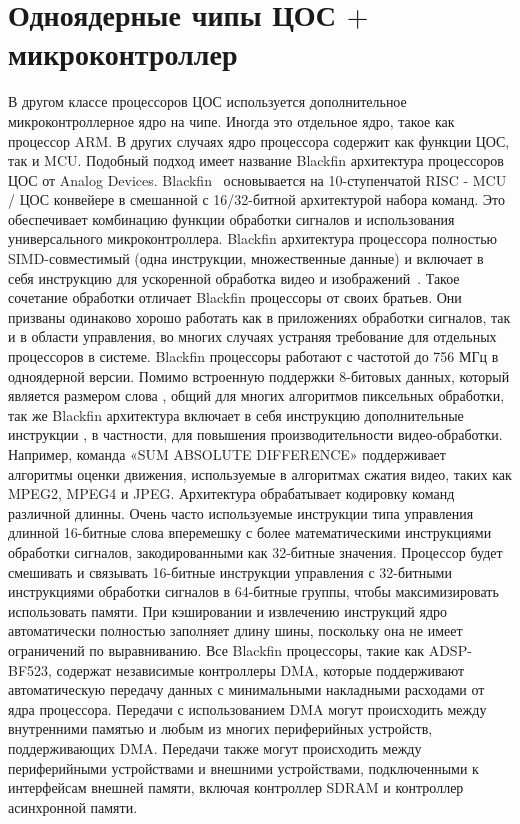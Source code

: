 \section{Одноядерные чипы ЦОС $ + $ микроконтроллер}

В другом классе процессоров ЦОС используется дополнительное микроконтроллерное ядро на чипе. Иногда это отдельное ядро, такое как процессор ARM. В других случаях ядро процессора содержит как функции ЦОС, так и MCU. Подобный подход имеет название Blackfin архитектура процессоров ЦОС от Analog Devices. 
Blackfin~\cite{blackfin} основывается на 10-ступенчатой RISC - MCU / ЦОС конвейере в смешанной с 16/32-битной архитектурой набора команд. Это обеспечивает комбинацию функции обработки сигналов и использования универсального микроконтроллера. Blackfin архитектура процессора полностью SIMD-совместимый (одна инструкции, множественные данные) и включает в себя инструкцию для ускоренной обработка видео и изображений~\cite{blackfin_data_sheet}. 
Такое сочетание обработки отличает Blackfin процессоры от своих братьев. Они призваны одинаково хорошо работать как в приложениях обработки сигналов, так и в области управления, во многих случаях устраняя требование для отдельных процессоров в системе. Blackfin процессоры работают с частотой до 756 МГц в одноядерной версии. 
Помимо встроенную поддержки 8-битовых данных, который является размером слова , общий для многих алгоритмов пиксельных обработки, так же Blackfin архитектура включает в себя инструкцию дополнительные инструкции , в частности, для повышения производительности видео-обработки. Например, команда «SUM ABSOLUTE DIFFERENCE» поддерживает алгоритмы оценки движения, используемые в алгоритмах сжатия видео, таких как MPEG2, MPEG4 и JPEG. 
Архитектура обрабатывает кодировку команд различной длинны. Очень часто используемые инструкции типа управления длинной 16-битные слова вперемешку с более математическими инструкциями обработки сигналов, закодированными как 32-битные значения. Процессор будет смешивать и связывать 16-битные инструкции управления с 32-битными инструкциями обработки сигналов в 64-битные группы, чтобы максимизировать использовать памяти. При кэшировании и извлечению инструкций  ядро автоматически полностью заполняет длину шины, поскольку она не имеет ограничений по выравниванию. 
Все Blackfin процессоры, такие как ADSP-BF523, содержат независимые контроллеры DMA, которые поддерживают автоматическую передачу данных с минимальными накладными расходами от ядра процессора. Передачи с использованием DMA могут происходить между внутренними памятью и любым из многих периферийных устройств, поддерживающих DMA. Передачи также могут происходить между периферийными устройствами и внешними устройствами, подключенными к интерфейсам внешней памяти, включая контроллер SDRAM и контроллер асинхронной памяти. 
